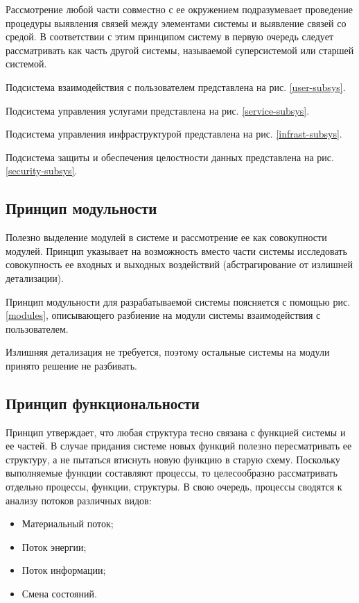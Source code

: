 Рассмотрение любой части совместно с ее окружением подразумевает проведение процедуры выявления связей между элементами системы и выявление связей со средой.
В соответствии с этим принципом систему в первую очередь следует рассматривать как часть другой системы, называемой суперсистемой или старшей системой.

Подсистема взаимодействия с пользователем представлена на рис. \ref{user-subsys}.

Подсистема управления услугами представлена на рис. \ref{service-subsys}.

Подсистема управления инфраструктурой представлена на рис. \ref{infrast-subsys}.

Подсистема защиты и обеспечения целостности данных представлена на рис. \ref{security-subsys}.

\subsection{Принцип модульности}

Полезно выделение модулей в системе и рассмотрение ее как совокупности модулей.
Принцип указывает на возможность вместо части системы исследовать совокупность ее входных и выходных воздействий (абстрагирование от излишней детализации).

Принцип модульности для разрабатываемой системы поясняется с помощью рис. \ref{modules}, описывающего разбиение на модули системы взаимодействия с пользователем.

Излишняя детализация не требуется, поэтому остальные системы на модули принято решение не разбивать.

\subsection{Принцип функциональности}

Принцип утверждает, что любая структура тесно связана с функцией системы и ее частей.
В случае придания системе новых функций полезно пересматривать ее структуру, а не пытаться втиснуть новую функцию в старую схему.
Поскольку выполняемые функции составляют процессы, то целесообразно рассматривать отдельно процессы, функции, структуры.
В свою очередь, процессы сводятся к анализу потоков различных видов:
\begin{itemize}
  \item Материальный поток;
  \item Поток энергии;
  \item Поток информации;
  \item Смена состояний.
\end{itemize}

